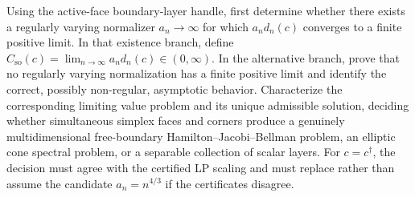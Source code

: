 Using the active-face boundary-layer handle, first determine whether there exists a regularly varying normalizer \(a_n\to\infty\) for which \(a_nd_n(c)\) converges to a finite positive limit. In that existence branch, define \(C_{\mathrm{so}}(c)=\lim_{n\to\infty}a_nd_n(c)\in(0,\infty)\). In the alternative branch, prove that no regularly varying normalization has a finite positive limit and identify the correct, possibly non-regular, asymptotic behavior. Characterize the corresponding limiting value problem and its unique admissible solution, deciding whether simultaneous simplex faces and corners produce a genuinely multidimensional free-boundary Hamilton--Jacobi--Bellman problem, an elliptic cone spectral problem, or a separable collection of scalar layers. For \(c=c^\dagger\), the decision must agree with the certified LP scaling and must replace rather than assume the candidate \(a_n=n^{4/3}\) if the certificates disagree.